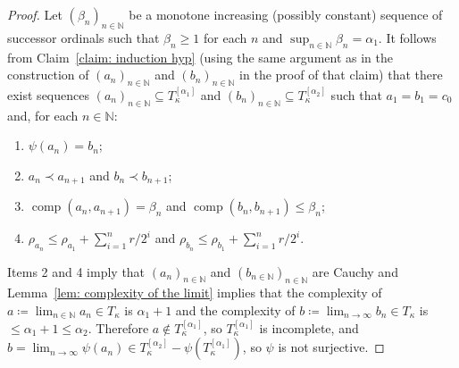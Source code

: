 \documentclass[10pt,a4paper]{amsart}
\DeclareMathOperator{\comp}{comp}
\begin{document}
\begin{proof}
    Let $(\beta_n)_{n \in \mathbb{N}}$ be a monotone increasing (possibly constant) sequence of successor ordinals such that $\beta_n \geq 1$ for each $n$ and $\sup_{n \in \mathbb{N}} \beta_n = \alpha_1$.
    It follows from Claim~\ref{claim: induction hyp} (using the same argument as in the construction of $(a_n)_{n \in \mathbb{N}}$ and $(b_n)_{n \in \mathbb{N}}$ in the proof of that claim) that there exist sequences $(a_n)_{n \in \mathbb{N}} \subseteq T_\kappa^{[\alpha_1]}$ and $(b_n)_{n \in \mathbb{N}} \subseteq T_\kappa^{[\alpha_2]}$ such that $a_1 = b_1 = c_0$ and, for each $n \in \mathbb{N}$:
    \begin{enumerate}
            \item $\psi(a_n) = b_n$;
            \item $a_n \prec a_{n+1}$ and $b_n \prec b_{n+1}$;
            \item $\comp(a_n,a_{n+1}) = \beta_{n}$ and $\comp(b_n, b_{n+1}) \leq \beta_{n}$;
            \item $\rho_{a_n} \leq \rho_{a_1} + \sum_{i=1}^n r/2^i$ and $\rho_{b_n} \leq \rho_{b_1} + \sum_{i=1}^n r/2^i$.
    \end{enumerate}
    Items 2 and 4 imply that $(a_n)_{n \in \mathbb{N}}$ and $(b_{n \in \mathbb{N}})_{n \in \mathbb{N}}$ are Cauchy and Lemma~\ref{lem: complexity of the limit} implies that the complexity of $a \coloneqq \lim_{n \in \mathbb{N}} a_n \in T_\kappa$ is $\alpha_1 + 1$ and the complexity of $b \coloneqq \lim_{n \rightarrow \infty} b_n \in T_\kappa$ is $\leq \alpha_1 + 1 \leq \alpha_2$. Therefore $a \notin T_\kappa^{[\alpha_1]}$, so $T_\kappa^{[\alpha_1]}$ is incomplete, and $b = \lim_{n \rightarrow \infty} \psi(a_n) \in T_\kappa^{[\alpha_2]} - \psi(T_\kappa^{[\alpha_1]})$, so $\psi$ is not surjective.
\end{proof}
\end{document}
